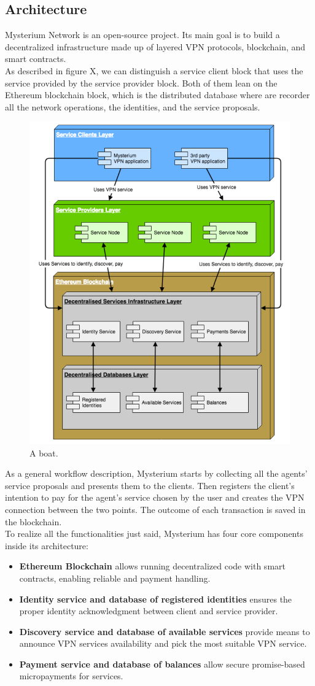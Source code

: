 \documentclass[]{article}
\begin{document}
	\subsection{Architecture}
	Mysterium Network is an open-source project. Its main goal is to build a decentralized infrastructure made up of layered VPN protocols, blockchain, and smart contracts.\\
	As described in figure X, we can distinguish a service client block that uses the service provided by the service provider block. Both of them lean on the Ethereum blockchain block, which is the distributed database where are recorder all the network operations, the identities, and the service proposals. 

	\begin{figure}
		\includegraphics[width=0.5\linewidth]{"images/mysterium_architecture.png"}
		\caption{A boat.}
		\label{fig:boat1}
	\end{figure}

	As a general workflow description, Mysterium starts by collecting all the agents' service proposals and presents them to the clients. Then registers the client's intention to pay for the agent's service chosen by the user and creates the VPN connection between the two points. The outcome of each transaction is saved in the blockchain.\\
	
	To realize all the functionalities just said, Mysterium has four core components inside its architecture:
	\begin{itemize}
		\item \textbf{Ethereum Blockchain} allows running decentralized code with smart contracts, enabling reliable and payment handling.
		\item \textbf{Identity service and database of registered identities} ensures the proper identity acknowledgment between client and service provider.
		\item \textbf{Discovery service and database of available services} provide means to announce VPN services availability and pick the most suitable VPN service.
		\item \textbf{Payment service and database of balances} allow secure promise-based micropayments for services.
	\end{itemize}
\end{document}
